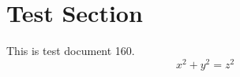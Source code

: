 \documentclass{article}
\begin{document}
\section{Test Section}
This is test document 160.
\begin{equation}
x^2 + y^2 = z^2
\end{equation}
\end{document}

